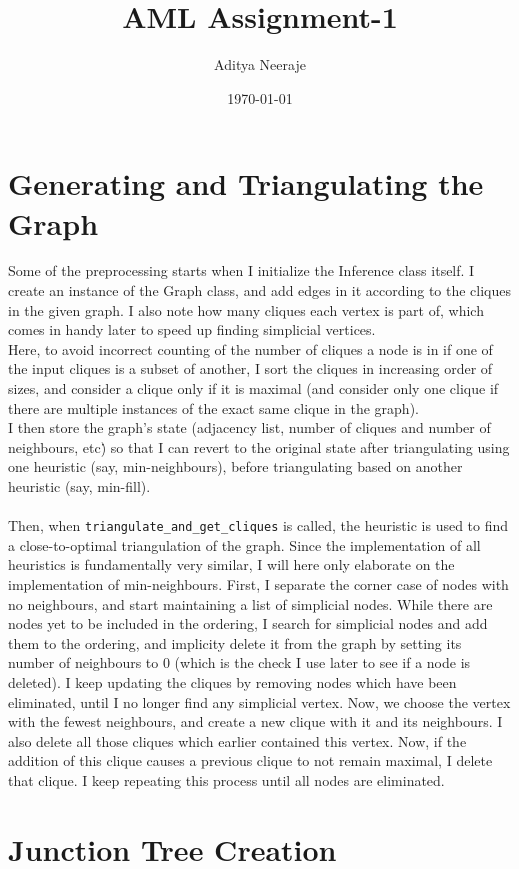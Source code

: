 \documentclass{article}
\title{AML Assignment-1}
\author{Aditya Neeraje}
\date{\today}
\begin{document}
\maketitle
\tableofcontents


\newpage

\section{Generating and Triangulating the Graph}
Some of the preprocessing starts when I initialize the Inference class itself. I create an instance of the Graph class, and add edges in it according to the cliques in the given graph. I also note how many cliques each vertex is part of, which comes in handy later to speed up finding simplicial vertices.\\
Here, to avoid incorrect counting of the number of cliques a node is in if one of the input cliques is a subset of another, I sort the cliques in increasing order of sizes, and consider a clique only if it is maximal (and consider only one clique if there are multiple instances of the exact same clique in the graph).\\
I then store the graph's state (adjacency list, number of cliques and number of neighbours, etc\.) so that I can revert to the original state after triangulating using one heuristic (say, min-neighbours), before triangulating based on another heuristic (say, min-fill).\\
\\
Then, when \texttt{triangulate\_and\_get\_cliques} is called, the heuristic is used to find a close-to-optimal triangulation of the graph. Since the implementation of all heuristics is fundamentally very similar, I will here only elaborate on the implementation of min-neighbours. First, I separate the corner case of nodes with no neighbours, and start maintaining a list of simplicial nodes. While there are nodes yet to be included in the ordering, I search for simplicial nodes and add them to the ordering, and implicity delete it from the graph by setting its number of neighbours to 0 (which is the check I use later to see if a node is deleted). I keep updating the cliques by removing nodes which have been eliminated, until I no longer find any simplicial vertex. Now, we choose the vertex with the fewest neighbours, and create a new clique with it and its neighbours. I also delete all those cliques which earlier contained this vertex. Now, if the addition of this clique causes a previous clique to not remain maximal, I delete that clique. I keep repeating this process until all nodes are eliminated.

\section{Junction Tree Creation}
\end{document}
